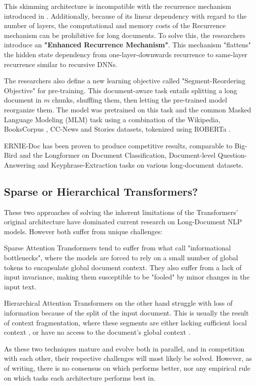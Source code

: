 \documentclass[preprint,review,12pt]{elsarticle}
\begin{document}
This skimming architecture is incompatible with the recurrence mechanism introduced in \citet{dai-etal-2019-transformer}. Additionally, because of its linear dependency with regard to the number of layers, the computational and memory costs of the Recurrence mechanism can be prohibitive for long documents. To solve this, the researchers introduce an \textbf{"Enhanced Recurrence Mechanism"}. This mechanism "flattens" the hidden state dependency from one-layer-downwards recurrence to same-layer recurrence similar to recursive DNNs.

The researchers also define a new learning objective called "Segment-Reordering Objective" for pre-training. This document-aware task entails splitting a long document in $m$ chunks, shuffling them, then letting the pre-trained model reorganize them. The model was pretrained on this task and the common Masked Language Modeling (MLM) task \cite{toutanova} using a combination of the Wikipedia, BooksCorpus \cite{kiros}, CC-News and Stories \cite{trinh} datasets, tokenized using ROBERTa \cite{roberta}.

ERNIE-Doc has been proven to produce competitive results, comparable to Big-Bird and the Longformer on Document Classification, Document-level Question-Answering and Keyphrase-Extraction tasks on various long-document datasets.


\subsection{Sparse or Hierarchical Transformers?}
These two approaches of solving the inherent limitations of the Transformers' original architecture have dominated current research on Long-Document NLP models. However both suffer from unique challenges:

Sparse Attention Transformers tend to suffer from what \citet{liu} call "informational bottlenecks", where the models are forced to rely on a small number of global tokens to encapsulate global document context. They also suffer from a lack of input invariance, making them susceptible to be "fooled" by minor changes in the input text.

Hierarchical Attention Transformers on the other hand struggle with loss of information because of the split of the input document. This is usually the result of context fragmentation, where these segments are either lacking sufficient local context \cite{dai}, or have no access to the document's global context \cite{qi}.

As these two techniques mature and evolve both in parallel, and in competition with each other, their respective challenges will most likely be solved. However, as of writing, there is no consensus on which performs better, nor any empirical rule on which tasks each architecture performs best in. 
 
\end{document}
